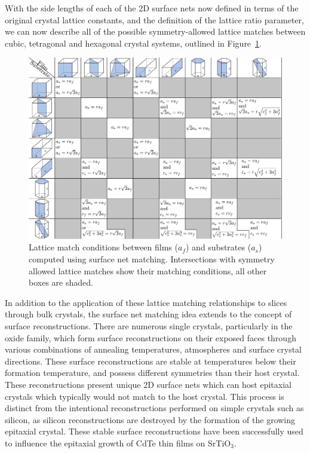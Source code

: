 \documentclass[final,5p,times,twocolumn]{elsarticle}
\begin{document}
With the side lengths of each of the 2D surface nets now defined in terms of the original crystal lattice constants, and the definition of the lattice ratio parameter, we can now describe all of the possible symmetry-allowed lattice matches between cubic, tetragonal and hexagonal crystal systems, outlined in Figure~\ref{fig:match_matrix}.
\begin{figure}
    \centering
    \includegraphics[width=\textwidth]{graphics/grid2.pdf}
    \caption{Lattice match conditions between films ($a_f$) and substrates ($a_s$) computed using surface net matching. Intersections with symmetry allowed lattice matches show their matching conditions, all other boxes are shaded.\label{fig:match_matrix}}
\end{figure}

In addition to the application of these lattice matching relationships to slices through bulk crystals, the surface net matching idea extends to the concept of surface reconstructions. There are numerous single crystals, particularly in the oxide family, which form surface reconstructions on their exposed faces through various combinations of annealing temperatures, atmospheres and surface crystal directions. These surface reconstructions are stable at temperatures below their formation temperature, and possess different symmetries than their host crystal. These reconstructions present unique 2D surface nets which can host epitaxial crystals which typically would not match to the host crystal. This process is distinct from the intentional reconstructions performed on simple crystals such as silicon, as silicon reconstructions are destroyed by the formation of the growing epitaxial crystal. These stable surface reconstructions have been successfully used to influence the epitaxial growth of CdTe thin films on SrTiO$_3$\cite{Neretina2009a}.
\end{document}
